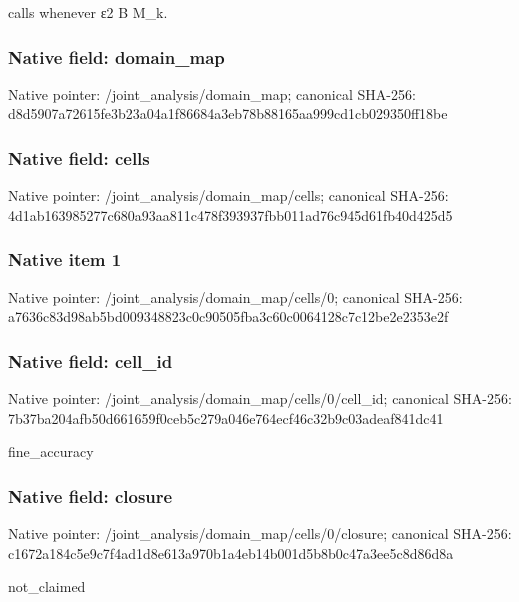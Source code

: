 \documentclass[10pt,a4paper]{article}
\begin{document}
\begingroup\raggedright{} calls whenever {\AtlasUnicodeText ε}\allowbreak{}2 B M\_\allowbreak{}k.\par\endgroup

\subsubsection{Native field: domain\_\allowbreak{}map}
Native pointer: /joint\_\allowbreak{}analysis/domain\_\allowbreak{}map; canonical SHA-256: d8d5907a72615fe3b23a04a1f86684a3eb78b88165aa999cd1cb029350ff18be

\subsubsection{Native field: cells}
Native pointer: /joint\_\allowbreak{}analysis/domain\_\allowbreak{}map/cells; canonical SHA-256: 4d1ab163985277c680a93aa811c478f393937fbb011ad76c945d61fb40d425d5

\subsubsection{Native item 1}
Native pointer: /joint\_\allowbreak{}analysis/domain\_\allowbreak{}map/cells/0; canonical SHA-256: a7636c83d98ab5bd009348823c0c90505fba3c60c0064128c7c12be2e2353e2f

\subsubsection{Native field: cell\_\allowbreak{}id}
Native pointer: /joint\_\allowbreak{}analysis/domain\_\allowbreak{}map/cells/0/cell\_\allowbreak{}id; canonical SHA-256: 7b37ba204afb50d661659f0ceb5c279a046e764ecf46c32b9c03adeaf841dc41

\begingroup\raggedright\sloppy fine\_\allowbreak{}accuracy\par\endgroup

\subsubsection{Native field: closure}
Native pointer: /joint\_\allowbreak{}analysis/domain\_\allowbreak{}map/cells/0/closure; canonical SHA-256: c1672a184c5e9c7f4ad1d8e613a970b1a4eb14b001d5b8b0c47a3ee5c8d86d8a

\begingroup\raggedright\sloppy not\_\allowbreak{}claimed\par\endgroup
\end{document}
